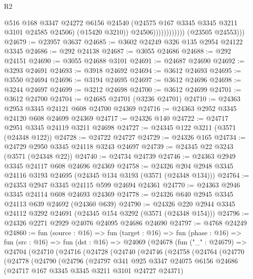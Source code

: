 \begin{lexlean}{R2}
\begin{coremodule}
                                  @516
                                  @168
                                  @3347
                                  @24272
                                  @6156
                                  @24540
                                  (@24575 @167 @3345 @3345 @3211 @3101 @24585 @24506)
                                  (@15420 @3210))
                                @24506))))))))))))
        (@23505 @24553)))
@24679 := @23957 @3637
@24685 := @3602 @24249 @326 @135 @2954 @24122 @3345
@24686 := @292 @24138
@24687 := @3055 @24686
@24688 := @292 @24151
@24690 := @3055 @24688 @3101
@24691 := @24687 @24690
@24692 := @3293 @24691
@24693 := @3918 @24692
@24694 := @3612 @24693
@24695 := @3550 @24694
@24696 := @3194 @24695
@24697 := @3612 @24696
@24698 := @3244 @24697
@24699 := @3212 @24698
@24700 := @3612 @24699
@24701 := @3612 @24700
@24704 := @24685 @24701 (@3236 @24701)
@24710 := @24363 @2953 @3345 @24121 @608 @24700 @24369
@24716 := @24363 @2952 @3345 @24120 @608 @24699 @24369
@24717 := @24326 @140
@24722 := @24717 @2951 @3345 @24119 @3211 @24698
@24727 := @24345 @122 @3211 (@3571 (@24348 @122))
@24728 := @24722 @24727
@24729 := @24326 @165
@24734 := @24729 @2950 @3345 @24118 @3243 @24697
@24739 := @24345 @22 @3243 (@3571 (@24348 @22))
@24740 := @24734 @24739
@24746 := @24363 @2949 @3345 @24117 @608 @24696 @24369
@24758 := @24326 @204 @2948 @3345 @24116 @3193 @24695 (@24345 @134 @3193 (@3571 (@24348 @134)))
@24764 := @24353 @2947 @3345 @24115 @599 @24694 @24361
@24770 := @24363 @2946 @3345 @24114 @608 @24693 @24369
@24778 := @24326 @640 @2945 @3345 @24113 @639 @24692 (@24360 @639)
@24790 := @24326 @220 @2944 @3345 @24112 @3292 @24691 (@24345 @154 @3292 (@3571 (@24348 @154)))
@24796 := @24326 @2271 @2929 @24076 @24095 @24686 @24690
@24797 := @4768 @24249
@24860 := fun (source : @16) =>
  fun (target : @16) =>
  fun (phase : @16) =>
  fun (src : @16) =>
  fun (dst : @16) =>
  @24069
    (@24678
      (fun ("_" : @24679) =>
      @24704
        (@24710
          (@24716
            (@24728
              (@24740
                (@24746
                  (@24758
                    (@24764
                      (@24770
                        (@24778
                          (@24790
                            (@24796
                              (@24797
                                @341
                                @925
                                @3347
                                @24075
                                @6156
                                @24686
                                (@24717 @167 @3345 @3345 @3211 @3101 @24727 @24371)

\end{coremodule}
\end{lexlean}
